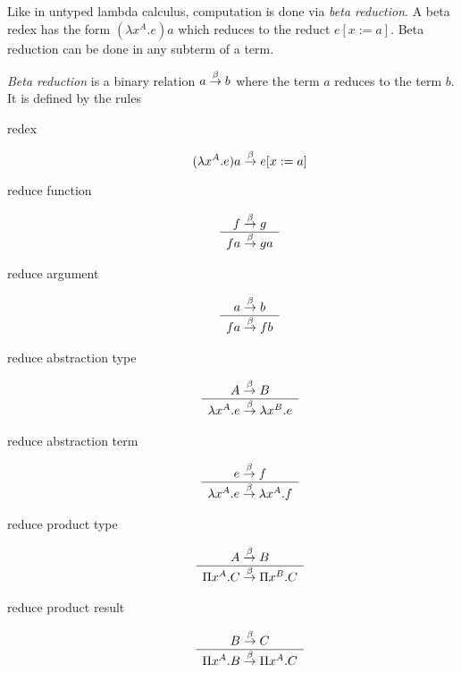 Like in untyped lambda calculus, computation is done via \emph{beta reduction}.
A beta redex has the form $(\lambda x^A. e) a$ which reduces to the reduct
$e[x:=a]$. Beta reduction can be done in any subterm of a term.

\begin{definition}
    \emph{Beta reduction}
    is a binary relation $a \stackrel{\beta}{\to} b$ where the term $a$
    reduces to the term $b$. It is defined by the rules
    \begin{description}

        \item[redex]
            $$
                (\lambda x^A. e) a \stackrel{\beta}{\to} e[x:=a]
            $$

        \item[reduce function]
            $$
                \begin{array}{c} 
                    f \stackrel{\beta}{\to} g
                 \\ \hline 
                    f a \stackrel{\beta}{\to} g a
                \end{array}
            $$

        \item[reduce argument]
            $$
                \begin{array}{c} 
                    a \stackrel{\beta}{\to} b
                 \\ \hline 
                    f a \stackrel{\beta}{\to} f b
                \end{array}
            $$

        \item[reduce abstraction type]
            $$
                \begin{array}{c} 
                    A \stackrel{\beta}{\to} B
                 \\ \hline 
                    \lambda x^A. e \stackrel{\beta}{\to} \lambda x^B . e
                \end{array}
            $$

        \item[reduce abstraction term]
            $$
                \begin{array}{c} 
                    e \stackrel{\beta}{\to} f
                 \\ \hline 
                    \lambda x^A. e \stackrel{\beta}{\to} \lambda x^A. f
                \end{array}
            $$

        \item[reduce product type]
            $$
                \begin{array}{c} 
                    A \stackrel{\beta}{\to} B
                 \\ \hline 
                    \Pi x^A. C \stackrel{\beta}{\to} \Pi x^B . C
                \end{array}
            $$

        \item[reduce product result]
            $$
                \begin{array}{c} 
                    B \stackrel{\beta}{\to} C
                 \\ \hline 
                    \Pi x^A. B \stackrel{\beta}{\to} \Pi x^A. C
                \end{array}
            $$
    \end{description}
\end{definition}



